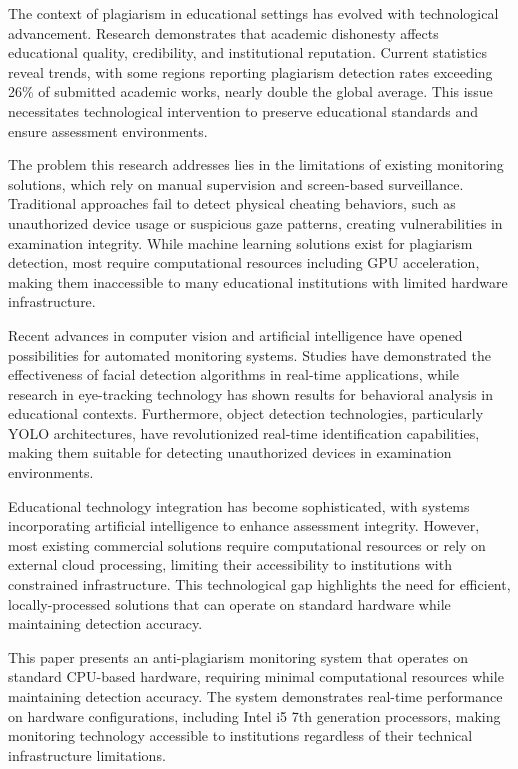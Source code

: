 \documentclass[conference]{IEEEtran}
\begin{document}
The context of plagiarism in educational settings has evolved with 
technological advancement. Research demonstrates that academic dishonesty affects 
educational quality, credibility, and institutional reputation\cite{pelican2021plagiat}. 
Current statistics reveal trends, with some regions reporting plagiarism 
detection rates exceeding 26\% of submitted academic works, nearly double the global 
average\cite{brainard2018massive}. This issue necessitates 
technological intervention to preserve educational standards and ensure 
assessment environments.

The problem this research addresses lies in the limitations of existing monitoring 
solutions, which rely on manual supervision and screen-based surveillance. 
Traditional approaches fail to detect physical cheating behaviors, such as unauthorized 
device usage or suspicious gaze patterns, creating vulnerabilities in examination 
integrity\cite{dilini2021cheating}. While machine learning solutions exist for plagiarism 
detection\cite{russell2020artificial}, most require computational resources 
including GPU acceleration, making them inaccessible to many educational institutions 
with limited hardware infrastructure.

Recent advances in computer vision and artificial intelligence have opened 
possibilities for automated monitoring systems. Studies have demonstrated the effectiveness 
of facial detection algorithms in real-time applications\cite{hasan2021face}, while 
research in eye-tracking technology has shown results for behavioral analysis 
in educational contexts\cite{el2023drowsiness}. Furthermore, object detection technologies, 
particularly YOLO architectures, have revolutionized real-time identification 
capabilities\cite{wang2022object}, making them suitable for detecting unauthorized 
devices in examination environments.

Educational technology integration has become sophisticated, with 
systems incorporating artificial intelligence to enhance assessment integrity\cite{honorlock2023detecting}. 
However, most existing commercial solutions require computational resources 
or rely on external cloud processing, limiting their accessibility to institutions 
with constrained infrastructure\cite{proctoru}. This technological gap highlights 
the need for efficient, locally-processed solutions that can operate on standard 
hardware while maintaining detection accuracy.

This paper presents an anti-plagiarism monitoring system that operates 
on standard CPU-based hardware, requiring minimal computational resources 
while maintaining detection accuracy. The system demonstrates 
real-time performance on hardware configurations, including Intel i5 7th 
generation processors, making monitoring technology accessible to institutions 
regardless of their technical infrastructure limitations.
\end{document}
